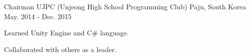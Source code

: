 

\begin{cventries}

  \cventry
    {Chairman} %
    {UJPC (Unjeong High School Programming Club)} %
    {Paju, South Korea} %
    {May. 2014 - Dec. 2015} %
    {
      \begin{cvitems} %
        \item {Learned Unity Engine and C\# language.}
        \item {Collaborated with others as a leader.}
      \end{cvitems}
    }

\end{cventries}
